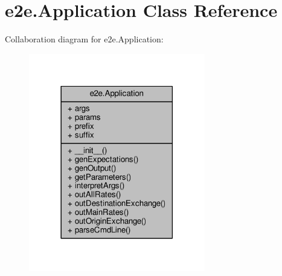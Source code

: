 \hypertarget{classe2e_1_1_application}{}\section{e2e.\+Application Class Reference}
\label{classe2e_1_1_application}


Collaboration diagram for e2e.\+Application\+:\nopagebreak
\begin{figure}[H]
\begin{center}
\leavevmode
\includegraphics[width=218pt]{classe2e_1_1_application__coll__graph}
\end{center}
\end{figure}
